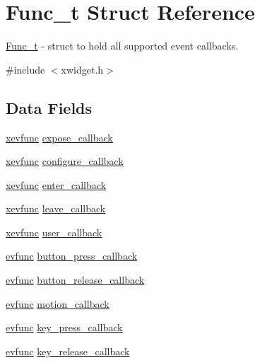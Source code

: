 \hypertarget{structFunc__t}{}\section{Func\+\_\+t Struct Reference}
\label{structFunc__t}


\hyperlink{structFunc__t}{Func\+\_\+t} -\/ struct to hold all supported event callbacks.  




{\ttfamily \#include $<$xwidget.\+h$>$}

\subsection*{Data Fields}
\begin{DoxyCompactItemize}
\item 
\hyperlink{xwidget_8h_a9ef0263424a7f5f8f6b02055fca67ddd}{xevfunc} \hyperlink{structFunc__t_ae4ba307ec29bfea83e1197aa750c1396}{expose\+\_\+callback}
\item 
\hyperlink{xwidget_8h_a9ef0263424a7f5f8f6b02055fca67ddd}{xevfunc} \hyperlink{structFunc__t_a7876670d3bb74b11ab93fe81908d04b0}{configure\+\_\+callback}
\item 
\hyperlink{xwidget_8h_a9ef0263424a7f5f8f6b02055fca67ddd}{xevfunc} \hyperlink{structFunc__t_a6ae24f219bf8eff4bd5fbdfa3f29c14d}{enter\+\_\+callback}
\item 
\hyperlink{xwidget_8h_a9ef0263424a7f5f8f6b02055fca67ddd}{xevfunc} \hyperlink{structFunc__t_a1801ba902bd7efc706d474312f960d0a}{leave\+\_\+callback}
\item 
\hyperlink{xwidget_8h_a9ef0263424a7f5f8f6b02055fca67ddd}{xevfunc} \hyperlink{structFunc__t_a1f089cb13a39764a1f980470a51db71b}{user\+\_\+callback}
\item 
\hyperlink{xwidget_8h_ab4ae973f86a383c8c0f92b709044520a}{evfunc} \hyperlink{structFunc__t_aa58bc35a1499d8cd850d2a083ad016f1}{button\+\_\+press\+\_\+callback}
\item 
\hyperlink{xwidget_8h_ab4ae973f86a383c8c0f92b709044520a}{evfunc} \hyperlink{structFunc__t_a8cb9d8135a178027675c96599ff8312e}{button\+\_\+release\+\_\+callback}
\item 
\hyperlink{xwidget_8h_ab4ae973f86a383c8c0f92b709044520a}{evfunc} \hyperlink{structFunc__t_ac2842c834907f4aeace8f404c6cc7621}{motion\+\_\+callback}
\item 
\hyperlink{xwidget_8h_ab4ae973f86a383c8c0f92b709044520a}{evfunc} \hyperlink{structFunc__t_a024ea4919029156d9415f1501cd8b0bf}{key\+\_\+press\+\_\+callback}
\item 
\hyperlink{xwidget_8h_ab4ae973f86a383c8c0f92b709044520a}{evfunc} \hyperlink{structFunc__t_a8c7138616caa404a9af064d673d7e0f8}{key\+\_\+release\+\_\+callback}
\end{DoxyCompactItemize}


